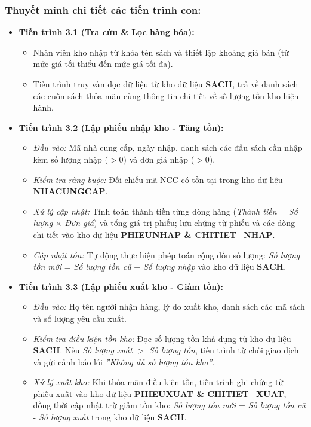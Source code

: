 \documentclass[12pt,a4paper]{article}
\begin{document}
\subsubsection*{Thuyết minh chi tiết các tiến trình con:}
\begin{itemize}
    \item \textbf{Tiến trình 3.1 (Tra cứu \& Lọc hàng hóa):}
    \begin{itemize}
        \item Nhân viên kho nhập từ khóa tên sách và thiết lập khoảng giá bán (từ mức giá tối thiểu đến mức giá tối đa).
        \item Tiến trình truy vấn đọc dữ liệu từ kho dữ liệu \textbf{SACH}, trả về danh sách các cuốn sách thỏa mãn cùng thông tin chi tiết về số lượng tồn kho hiện hành.
    \end{itemize}

    \item \textbf{Tiến trình 3.2 (Lập phiếu nhập kho - Tăng tồn):}
    \begin{itemize}
        \item \textit{Đầu vào:} Mã nhà cung cấp, ngày nhập, danh sách các đầu sách cần nhập kèm số lượng nhập ($> 0$) và đơn giá nhập ($> 0$).
        \item \textit{Kiểm tra ràng buộc:} Đối chiếu mã NCC có tồn tại trong kho dữ liệu \textbf{NHACUNGCAP}.
        \item \textit{Xử lý cập nhật:} Tính toán thành tiền từng dòng hàng (\textit{Thành tiền} = \textit{Số lượng} $\times$ \textit{Đơn giá}) và tổng giá trị phiếu; lưu chứng từ phiếu và các dòng chi tiết vào kho dữ liệu \textbf{PHIEUNHAP \& CHITIET\_NHAP}.
        \item \textit{Cập nhật tồn:} Tự động thực hiện phép toán cộng dồn số lượng: \textit{Số lượng tồn mới} = \textit{Số lượng tồn cũ} + \textit{Số lượng nhập} vào kho dữ liệu \textbf{SACH}.
    \end{itemize}

    \item \textbf{Tiến trình 3.3 (Lập phiếu xuất kho - Giảm tồn):}
    \begin{itemize}
        \item \textit{Đầu vào:} Họ tên người nhận hàng, lý do xuất kho, danh sách các mã sách và số lượng yêu cầu xuất.
        \item \textit{Kiểm tra điều kiện tồn kho:} Đọc số lượng tồn khả dụng từ kho dữ liệu \textbf{SACH}. Nếu \textit{Số lượng xuất} $>$ \textit{Số lượng tồn}, tiến trình từ chối giao dịch và gửi cảnh báo lỗi \textit{''Không đủ số lượng tồn kho''}.
        \item \textit{Xử lý xuất kho:} Khi thỏa mãn điều kiện tồn, tiến trình ghi chứng từ phiếu xuất vào kho dữ liệu \textbf{PHIEUXUAT \& CHITIET\_XUAT}, đồng thời cập nhật trừ giảm tồn kho: \textit{Số lượng tồn mới} = \textit{Số lượng tồn cũ} - \textit{Số lượng xuất} trong kho dữ liệu \textbf{SACH}.
    \end{itemize}
\end{itemize}
\end{document}
